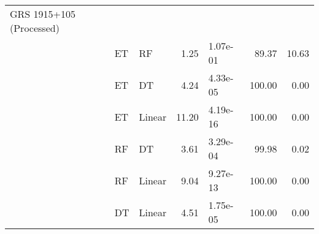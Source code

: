 \documentclass[fleqn,usenatbib,twocolumn]{mnras}%
\begin{document}
\begin{table*}
\begin{tabular}{lllrlrr}
GRS 1915+105 (Processed) & & & & & & \\
&  ET & RF &  1.25 & 1.07e-01 &                  89.37 &                   10.63 \\
&  ET & DT &  4.24 & 4.33e-05 &                 100.00 &                    0.00 \\
&  ET & Linear & 11.20 & 4.19e-16 &                 100.00 &                    0.00 \\
& RF & DT &  3.61 & 3.29e-04 &                  99.98 &                    0.02 \\
& RF & Linear &  9.04 & 9.27e-13 &                 100.00 &                    0.00 \\
& DT & Linear &  4.51 & 1.75e-05 &                 100.00 &                    0.00 \\
\bottomrule
\end{tabular}
\end{table*}
\end{document}
